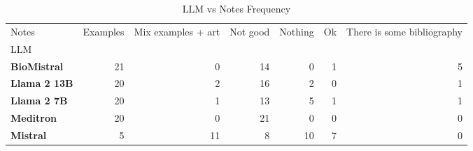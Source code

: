 \begin{table}
\caption{LLM vs Notes Frequency}
\label{tab:llm_notes}
\begin{tabular}{lrrrrrr}
\toprule
Notes & Examples & Mix examples + art & Not good & Nothing & Ok & There is some bibliography \\
LLM &  &  &  &  &  &  \\
\midrule
\textbf{BioMistral} & 21 & 0 & 14 & 0 & 1 & 5 \\
\textbf{Llama 2 13B} & 20 & 2 & 16 & 2 & 0 & 1 \\
\textbf{Llama 2 7B} & 20 & 1 & 13 & 5 & 1 & 1 \\
\textbf{Meditron} & 20 & 0 & 21 & 0 & 0 & 0 \\
\textbf{Mistral} & 5 & 11 & 8 & 10 & 7 & 0 \\
\bottomrule
\end{tabular}
\end{table}
